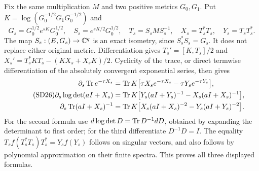 Fix the same multiplication $M$ and two positive metrics $G_0,G_1$.
Put $K=\log(G_0^{-1/2}G_1G_0^{-1/2})$ and
\[
G_s=G_0^{1/2}e^{sK}G_0^{1/2},\quad
S_s=e^{sK/2}G_0^{1/2},\quad T_s=S_sMS_s^{-1},\quad
X_s=T_s^*T_s,\quad Y_s=T_sT_s^*.
\]
The map $S_s:(E,G_s)\to\mathbb C^q$ is an exact isometry, since
$S_s^*S_s=G_s$. It does not replace either original metric.
Differentiation gives $T_s'=[K,T_s]/2$ and
$X_s'=T_s^*KT_s-(KX_s+X_sK)/2$. Cyclicity of the trace, or direct
termwise differentiation of the absolutely convergent exponential
series, then gives
\begin{equation}\tag{SD26}
\begin{aligned}
\partial_s\operatorname{Tr} e^{-\tau X_s}
&=\operatorname{Tr} K\bigl[\tau X_se^{-\tau X_s}-\tau Y_se^{-\tau Y_s}\bigr],\\
\partial_s\log\det(aI+X_s)
&=\operatorname{Tr} K\bigl[Y_s(aI+Y_s)^{-1}-X_s(aI+X_s)^{-1}\bigr],\\
\partial_s\operatorname{Tr}(aI+X_s)^{-1}
&=\operatorname{Tr} K\bigl[X_s(aI+X_s)^{-2}-Y_s(aI+Y_s)^{-2}\bigr].
\end{aligned}
\end{equation}
For the second formula use $d\log\det D=\operatorname{Tr} D^{-1}dD$, obtained by
expanding the determinant to first order; for the third differentiate
$D^{-1}D=I$. The equality
$T_s f(T_s^*T_s)T_s^*=Y_sf(Y_s)$ follows on singular vectors, and
also follows by polynomial approximation on their finite spectra.
This proves all three displayed formulas.

